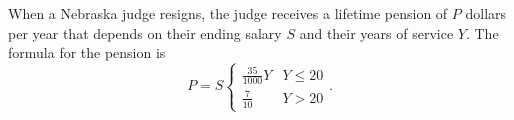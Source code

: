 \documentclass[12pt,fleqn,answers]{exam}
\begin{document}
\begin{questions}
\begin{solution}
\end{solution}

\newpage

\question[1] When a Nebraska judge resigns, the judge receives a lifetime pension of $P$ dollars per year that depends on their ending salary $S$ and their years of service $Y$. The formula for the pension is
\begin{equation}
  P = S \begin{cases}  \frac{35}{1000} Y &  Y \leq 20 \\  \frac{7}{10} &  Y >  20 \end{cases}.
  \end{equation}
  
\end{questions}
\end{document}
